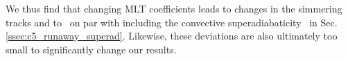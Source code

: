 We thus find that changing MLT coefficients leads to changes in the simmering tracks and to \Mcrit\ on par with including the convective superadiabaticity \dnabconv\ in Sec. \ref{ssec:c5_runaway_superad}.  Likewise, these deviations are also ultimately too small to significantly change our results.



